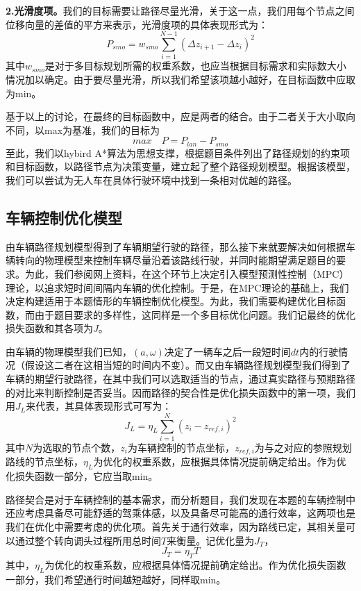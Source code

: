 \documentclass{article}
\begin{document}
    \textbf{2.光滑度项。}我们的目标需要让路径尽量光滑，关于这一点，我们用每个节点之间位移向量的差值的平方来表示，光滑度项的具体表现形式为：
           \begin{equation}
    	P_{smo}=w_{smo}\sum_{i=1}^{N-1}(\Delta z_{i+1}-\Delta z_{i})^2
    \end{equation}
	其中$w_{smo}$是对于多目标规划所需的权重系数，也应当根据目标需求和实际数大小情况加以确定。由于要尽量光滑，所以我们希望该项越小越好，在目标函数中应取为min。
	
	基于以上的讨论，在最终的目标函数中，应是两者的结合。由于二者关于大小取向不同，以max为基准，我们的目标为
	\begin{equation}
	max\quad P=P_{lan}-P_{smo}
	\end{equation}
	至此，我们以hybird A*算法为思想支撑，根据题目条件列出了路径规划的约束项和目标函数，以路径节点为决策变量，建立起了整个路径规划模型。根据该模型，我们可以尝试为无人车在具体行驶环境中找到一条相对优越的路径。
	\subsection{车辆控制优化模型}
	由车辆路径规划模型得到了车辆期望行驶的路径，那么接下来就要解决如何根据车辆转向的物理模型来控制车辆尽量沿着该路线行驶，并同时能期望满足题目的要求。为此，我们参阅网上资料，在这个环节上决定引入模型预测性控制（MPC）理论，以追求短时间间隔内车辆的优化控制。于是，在MPC理论的基础上，我们决定构建适用于本题情形的车辆控制优化模型。为此，我们需要构建优化目标函数，而由于题目要求的多样性，这同样是一个多目标优化问题。我们记最终的优化损失函数和其各项为$J$。

    由车辆的物理模型我们已知，$(a,\omega)$决定了一辆车之后一段短时间$dt$内的行驶情况（假设这二者在这相当短的时间内不变）。而又由车辆路径规划模型我们得到了车辆的期望行驶路径，在其中我们可以选取适当的节点，通过真实路径与预期路径的对比来判断控制是否妥当。因而路径的契合性是优化损失函数中的第一项，我们用$J_{L}$来代表，其具体表现形式可写为：
    \begin{equation}
    	J_{L}=\eta_{L}\sum_{i=1}^{N}(z_{i}-z_{ref,i})^2
    \end{equation}
	其中$N$为选取的节点个数，$z_{i}$为车辆控制的节点坐标，$z_{ref,i}$为与之对应的参照规划路线的节点坐标，$\eta_{L}$为优化的权重系数，应根据具体情况提前确定给出。作为优化损失函数一部分，它应当取min。

	路径契合是对于车辆控制的基本需求，而分析题目，我们发现在本题的车辆控制中还应考虑具备尽可能舒适的驾乘体感，以及具备尽可能高的通行效率，这两项也是我们在优化中需要考虑的优化项。首先关于通行效率，因为路线已定，其相关量可以通过整个转向调头过程所用总时间$T$来衡量。记优化量为$J_{T}$，
	\begin{equation}
		J_{T}=\eta_{T}T
	\end{equation}
	其中，$\eta_{L}$为优化的权重系数，应根据具体情况提前确定给出。作为优化损失函数一部分，我们希望通行时间越短越好，同样取min。
	
\end{document}

